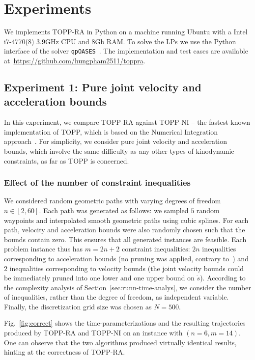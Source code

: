 \documentclass[journal]{IEEEtran}
\theoremstyle{plain}
\theoremstyle{definition}
\theoremstyle{definition}
\begin{document}
\section{Experiments}
\label{sec:experiments}

We implements TOPP-RA in Python on a machine running Ubuntu with a
Intel i7-4770(8) 3.9GHz CPU and 8Gb RAM\@. To solve the LPs we use the
Python interface of the solver
\texttt{qpOASES}~\cite{Ferreau2014}. The implementation and test cases
are available at~\url{https://github.com/hungpham2511/toppra}.

\subsection{Experiment 1: Pure joint velocity and acceleration bounds}
\label{sec:time-optimal-path}

In this experiment, we compare TOPP-RA against TOPP-NI -- the fastest
known implementation of TOPP, which is based on the Numerical
Integration approach~\cite{pham2014general}. For simplicity, we
consider pure joint velocity and acceleration bounds, which involve
the same difficulty as any other types of kinodynamic constraints, as
far as TOPP is concerned.

\subsubsection{Effect of the number of constraint inequalities}

We considered random geometric paths with varying degrees of freedom
$n\in[2,60]$. Each path was generated as follows: we sampled $5$
random waypoints and interpolated smooth geometric paths using cubic
splines. For each path, velocity and acceleration bounds were also
randomly chosen such that the bounds contain zero. This ensures that
all generated instances are feasible. Each problem instance thus has
$m=2n+2$ constraint inequalities: $2n$ inequalities corresponding to
acceleration bounds (no pruning was applied, contrary
to~\cite{hauser2014}) and $2$ inequalities corresponding to velocity
bounds (the joint velocity bounds could be immediately pruned into one
lower and one upper bound on $\dot s$). According to the complexity
analysis of Section~\ref{sec:runn-time-analys}, we consider the number
of inequalities, rather than the degree of freedom, as independent
variable. Finally, the discretization grid size was chosen as $N=500$.

Fig.~\ref{fig:correct} shows the time-parameterizations and the
resulting trajectories produced by TOPP-RA and TOPP-NI on an instance with
$(n=6, m=14)$. One can observe that the two algorithms produced
virtually identical results, hinting at the correctness of TOPP-RA.
\end{document}
